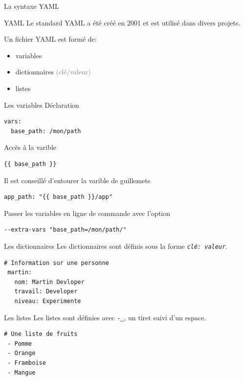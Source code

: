 \documentclass[compress]{smilebeamer}
\begin{document}
\begin{frame}
\begin{center}
\textcolor{smileOrange}{\huge{La syntaxe YAML}}
\end{center}
\end{frame}

\begin{frame}
\begin{exampleblock}{YAML}
Le standard YAML a été créé en 2001 et est utilisé dans divers projets.
\end{exampleblock}
Un fichier YAML est formé de:
\begin{itemize}
	\item variables
	\item dictionnaires \textcolor{gray}{(clé/valeur)}
	\item listes
\end{itemize}
\end{frame}

\begin{frame}[fragile]{Les variables}
Déclaration
\begin{lstlisting}[style=shell]
vars:
  base_path: /mon/path
\end{lstlisting}
Accès à la varible
\begin{lstlisting}[style=shell]
{{ base_path }}
\end{lstlisting}
Il est conseillé d'entourer la varible de guillemets
\begin{lstlisting}[style=shell]
app_path: "{{ base_path }}/app"
\end{lstlisting}
Passer les variables en ligne de commande avec l'option
\begin{lstlisting}[style=shell]
--extra-vars "base_path=/mon/path/"
\end{lstlisting}
\end{frame}

\begin{frame}[fragile]{Les dictionnaires}
Les dictionnaires sont définis sous la forme \textit{\texttt{clé: valeur}}.
\begin{lstlisting}[style=bitbake]
# Information sur une personne
 martin:
   nom: Martin Devloper
   travail: Developer
   niveau: Experimente
\end{lstlisting}
\end{frame}

\begin{frame}[fragile]{Les listes}
Les listes sont définies avec \textit{\texttt{-\textcolor{gray}{␣}}}, un tiret suivi d’un espace.
\begin{lstlisting}[style=bitbake]
# Une liste de fruits
 - Pomme
 - Orange
 - Framboise
 - Mangue
\end{lstlisting}
\end{frame}
\end{document}
